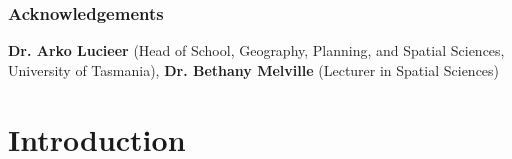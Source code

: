 \documentclass{thesis}
\begin{document}
\clearpage

\section*{Acknowledgements}

\ifdrafting\else
\textbf{Dr. Arko Lucieer} (Head of School, Geography, Planning, and Spatial Sciences, University of Tasmania), 
\textbf{Dr. Bethany Melville} (Lecturer in Spatial Sciences) 

\vspace{5mm}
\begin{quotation}
\end{quotation}

\begin{quotation}
\end{quotation}

\contentspage
\pagestyle{header-footer}
\part{Introduction}






\setcounter{chapter}{0}
\end{document}

